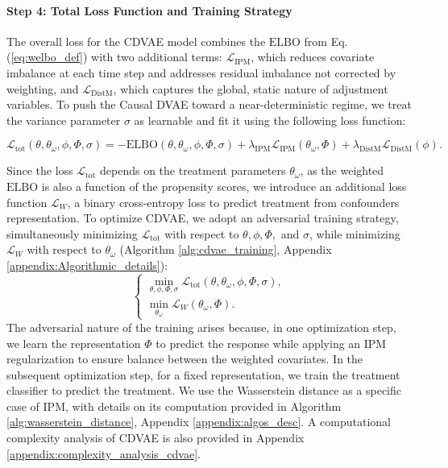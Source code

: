 \documentclass[10pt]{article} %
\begin{document}
\paragraph{Step 4: Total Loss Function and Training Strategy}  
The overall loss for the CDVAE model combines the $\mathrm{ELBO}$ from Eq. (\ref{eq:welbo_def}) with two additional terms: \(\mathcal{L}_{\mathrm{IPM}}\), which reduces covariate imbalance at each time step and addresses residual imbalance not corrected by weighting, and \(\mathcal{L}_{\mathrm{DistM}}\), which captures the global, static nature of adjustment variables. To push the Causal DVAE toward a near-deterministic regime, we treat the variance parameter \(\sigma\) as learnable and fit it using the following loss function:  

\begin{equation}
\label{eq:tot_loss}
\mathcal{L}_{\mathrm{tot}}(\theta, \theta_{\omega}, \phi, \Phi, \sigma) = -\mathrm{ELBO}(\theta, \theta_{\omega}, \phi, \Phi, \sigma) + \lambda_{\mathrm{IPM}} \mathcal{L}_{\mathrm{IPM}}(\theta_{\omega}, \Phi) + \lambda_{\mathrm{DistM}} \mathcal{L}_{\mathrm{DistM}}(\phi).
\end{equation}

Since the loss \(\mathcal{L}_{\mathrm{tot}}\) depends on the treatment parameters \(\theta_{\omega}\), as the weighted \(\mathrm{ELBO}\) is also a function of the propensity scores, we introduce an additional loss function \(\mathcal{L}_{W}\), a binary cross-entropy loss to predict treatment from confounders representation. To optimize CDVAE, we adopt an adversarial training strategy, simultaneously minimizing \(\mathcal{L}_{\mathrm{tot}}\) with respect to \(\theta, \phi, \Phi,\) and \(\sigma\), while minimizing \(\mathcal{L}_{W}\) with respect to \(\theta_{\omega}\) (Algorithm \ref{alg:cdvae_training}, Appendix \ref{appendix:Algorithmic_details}):  
\[
\begin{cases}
\min_{\theta, \phi, \Phi, \sigma} \mathcal{L}_{\mathrm{tot}}(\theta, \theta_{\omega}, \phi, \Phi, \sigma), \\
\min_{\theta_{\omega}} \mathcal{L}_{W}(\theta_{\omega}, \Phi).
\end{cases}
\]
The adversarial nature of the training arises because, in one optimization step, we learn the representation \(\Phi\) to predict the response while applying an IPM regularization to ensure balance between the weighted covariates. In the subsequent optimization step, for a fixed representation, we train the treatment classifier to predict the treatment. We use the Wasserstein distance as a specific case of IPM, with details on its computation provided in Algorithm \ref{alg:wasserstein_distance}, Appendix \ref{appendix:algos_desc}. A computational complexity analysis of CDVAE is also provided in Appendix \ref{appendix:complexity_analysis_cdvae}.
\end{document}
